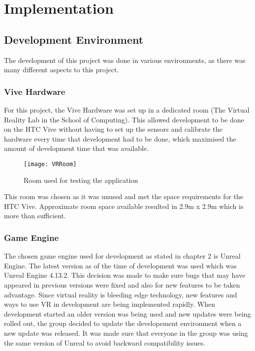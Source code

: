 \chapter{Implementation}
\label{chapter6}

\section{Development Environment}
The development of this project was done in various environments, as there was many different aspects to this project.

\subsection{Vive Hardware}
For this project, the Vive Hardware was set up in a dedicated room (The Virtual Reality Lab in the School of Computing). This allowed development to be done on the HTC Vive without having to set up the sensors and calibrate the hardware every time that development had to be done, which maximised the amount of development time that was available.

\begin{figure}[H]
	\texttt{[image: VRRoom]}
	\centering
	\caption{Room used for testing the application}
	\label{fig:VRRoom}
\end{figure}

This room was chosen as it was unused and met the space requirements for the HTC Vive. Approximate room space available resulted in 2.9m x 2.9m which is more than sufficient.

\subsection{Game Engine}
 The chosen game engine used for development as stated in chapter 2 is Unreal Engine. The latest version as of the time of development was used which was Unreal Engine 4.13.2. This decision was made to make sure bugs that may have appeared in previous versions were fixed and also for new features to be taken advantage. Since virtual reality is bleeding edge technology, new features and ways to use VR in development are being implemented rapidly. When development started an older version was being used and new updates were being rolled out, the group decided to update the developement environment when a new update was released. It was made sure that everyone in the group was using the same version of Unreal to avoid backward compatibility issues.

